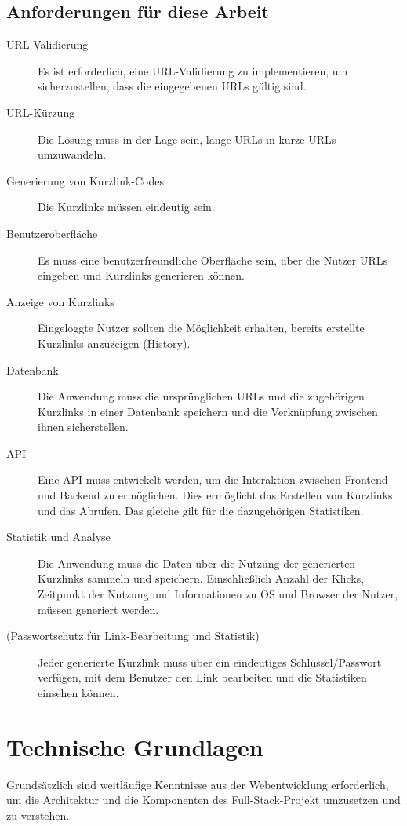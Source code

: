 \documentclass[a4paper,11pt,DIV=12,overfullrule=on]{scrreprt}
\begin{document}
\section{Anforderungen für diese Arbeit}
\begin{description}
    \item[URL-Validierung] Es ist erforderlich, eine URL-Validierung zu implementieren, um sicherzustellen, dass die eingegebenen URLs gültig sind.
    \item[URL-Kürzung] Die Lösung muss in der Lage sein, lange URLs in kurze URLs umzuwandeln.
    \item[Generierung von Kurzlink-Codes] Die Kurzlinks müssen eindeutig sein.
    \item[Benutzeroberfläche] Es muss eine benutzerfreundliche Oberfläche sein, über die Nutzer URLs eingeben und Kurzlinks generieren können.
    \item[Anzeige von Kurzlinks] Eingeloggte Nutzer sollten die Möglichkeit erhalten, bereits erstellte Kurzlinks anzuzeigen (History).
    \item[Datenbank] Die Anwendung muss die ursprünglichen URLs und die zugehörigen Kurzlinks in einer Datenbank speichern und die Verknüpfung zwischen ihnen sicherstellen.
    \item[API] Eine API muss entwickelt werden, um die Interaktion zwischen Frontend und Backend zu ermöglichen. Dies ermöglicht das Erstellen von Kurzlinks und das Abrufen. Das gleiche gilt für die dazugehörigen Statistiken.
    \item[Statistik und Analyse] Die Anwendung muss die Daten über die Nutzung der generierten Kurzlinks sammeln und speichern. Einschließlich Anzahl der Klicks, Zeitpunkt der Nutzung und Informationen zu OS und Browser der Nutzer, müssen generiert werden.
    \item[(Passwortschutz für Link-Bearbeitung und Statistik)] Jeder generierte Kurzlink muss über ein eindeutiges Schlüssel/Passwort verfügen, mit dem Benutzer den Link bearbeiten und die Statistiken einsehen können.
\end{description}

\chapter{Technische Grundlagen}
Grundsätzlich sind weitläufige Kenntnisse aus der Webentwicklung erforderlich, um die Architektur und die Komponenten des Full-Stack-Projekt umzusetzen und zu verstehen.
\end{document}
